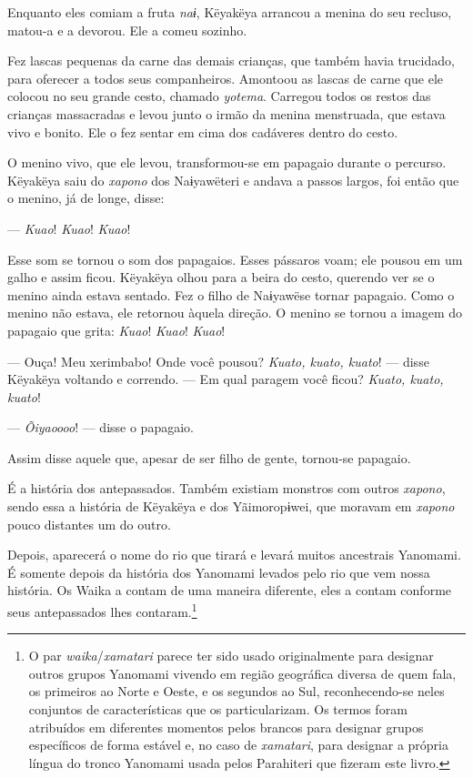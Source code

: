 Enquanto eles comiam a fruta \textit{naɨ}, Këyakëya arrancou a menina do
 seu recluso, matou-a e a devorou. Ele a comeu sozinho.

Fez lascas pequenas da carne das demais crianças, que também havia
 trucidado, para oferecer a todos seus companheiros. Amontoou as lascas de
 carne que ele colocou no seu grande cesto, chamado \textit{yotema}.
 Carregou todos os restos das crianças massacradas e levou junto o irmão
 da menina menstruada, que estava vivo e bonito. Ele o fez sentar em cima
 dos cadáveres dentro do cesto. 

O menino vivo, que ele levou, transformou-se em papagaio durante o
 percurso. Këyakëya saiu do \textit{xapono} dos Naɨyawëteri e andava a passos
 largos, foi então que o menino, já de longe, disse:

--- \textit{Kuao}! \textit{Kuao}! \textit{Kuao}!

Esse som se tornou o som dos papagaios. Esses pássaros voam; ele pousou
em um galho e assim ficou. Këyakëya olhou para a beira do cesto,
querendo ver se o menino ainda estava sentado. Fez o filho de Naɨyawëse
tornar papagaio. Como o menino não estava, ele retornou àquela direção.
O menino se tornou a imagem do papagaio que grita: \textit{Kuao}! \textit{Kuao}!
\textit{Kuao}!

--- Ouça! Meu xerimbabo! Onde você pousou? \textit{Kuato, kuato, kuato}! ---
disse Këyakëya voltando e correndo. --- Em qual paragem você
ficou? \textit{Kuato, kuato, kuato}!

--- \textit{Õiyaoooo}! --- disse o papagaio. 

Assim disse aquele que, apesar de ser filho de gente, tornou-se
 papagaio.

É a história dos antepassados. Também existiam monstros com outros
  \textit{xapono}, sendo essa a história de Këyakëya e dos Yãimoropɨwei, que
  moravam em \textit{xapono} pouco distantes um do outro.

Depois, aparecerá o nome do rio que tirará e levará muitos ancestrais
Yanomami. É somente depois da história dos Yanomami levados pelo rio que
vem nossa história. Os Waika a contam de uma maneira diferente, eles a
contam conforme seus antepassados lhes contaram.\footnote{O par \textit{waika}/\textit{xamatari} parece ter sido usado originalmente para designar outros grupos Yanomami vivendo em região geográfica diversa de quem fala, os primeiros ao Norte e Oeste, e os segundos ao Sul, reconhecendo-se neles conjuntos de características que os particularizam. Os termos foram atribuídos em diferentes momentos pelos brancos para designar grupos específicos de forma estável e, no caso de \textit{xamatari}, para designar a própria língua do tronco Yanomami usada pelos Parahiteri que fizeram este livro.} 

